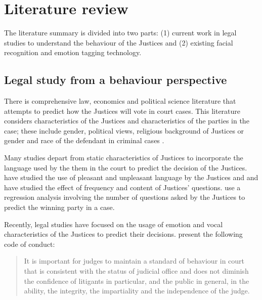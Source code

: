\documentclass{monashthesis}
\begin{document}
\hypertarget{literature-review}{%
\section{Literature review}\label{literature-review}}

The literature summary is divided into two parts: (1) current work in legal studies to understand the behaviour of the Justices and (2) existing facial recognition and emotion tagging technology.

\hypertarget{legal-study-from-a-behaviour-perspective}{%
\subsection{Legal study from a behaviour perspective}\label{legal-study-from-a-behaviour-perspective}}

There is comprehensive law, economics and political science literature that attempts to predict how the Justices will vote in court cases. This literature considers characteristics of the Justices and characteristics of the parties in the case; these include gender, political views, religious background of Justices or gender and race of the defendant in criminal cases \autocites{Stuart1962}{Peter1984}{Combining1987}{Steffensmeier2001}{Kulik2003}.

Many studies depart from static characteristics of Justices to incorporate the language used by the them in the court to predict the decision of the Justices.
\textcite{black2011emotions} have studied the use of pleasant and unpleasant language by the Justices and \textcite{Shullman2004illusion} and \textcite{johnson2009inquiring} have studied the effect of frequency and content of Justices' questions. \textcite{epstein2010inferring} use a regression analysis involving the number of questions asked by the Justices to predict the winning party in a case.

Recently, legal studies have focused on the usage of emotion and vocal characteristics of the Justices to predict their decisions. \textcite{judicalguid} present the following code of conduct:

\begin{quote}
It is important for judges to maintain a standard of behaviour in court that is consistent with the status of judicial office and does not diminish the confidence of litigants in particular, and the public in general, in the ability, the integrity, the impartiality and the independence of the judge.
\end{quote}
\end{document}

